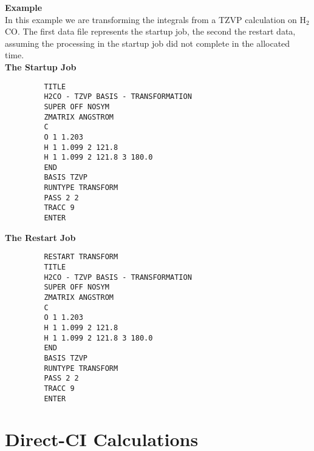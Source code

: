 \documentclass[11pt,fleqn]{article}
\newcommand{\formaldehyde}{\mbox{H$_{2}$CO}}
\begin{document}
{\bf Example}\\

In this example we are transforming the integrals from a TZVP
calculation on \formaldehyde. The first data file represents
the startup job, the second the restart data, assuming the
processing in the startup job did not complete in
the allocated time.\\

{\bf The Startup Job}
{
\footnotesize
\begin{verbatim}
         TITLE
         H2CO - TZVP BASIS - TRANSFORMATION
         SUPER OFF NOSYM
         ZMATRIX ANGSTROM
         C
         O 1 1.203
         H 1 1.099 2 121.8
         H 1 1.099 2 121.8 3 180.0
         END
         BASIS TZVP
         RUNTYPE TRANSFORM
         PASS 2 2
         TRACC 9
         ENTER
\end{verbatim}
}
{\bf The Restart Job}
{
\footnotesize
\begin{verbatim}
         RESTART TRANSFORM
         TITLE
         H2CO - TZVP BASIS - TRANSFORMATION
         SUPER OFF NOSYM
         ZMATRIX ANGSTROM
         C
         O 1 1.203
         H 1 1.099 2 121.8
         H 1 1.099 2 121.8 3 180.0
         END
         BASIS TZVP
         RUNTYPE TRANSFORM
         PASS 2 2
         TRACC 9
         ENTER
\end{verbatim}
}


\section[Direct-CI Calculations]{Direct-CI Calculations}
\end{document}
